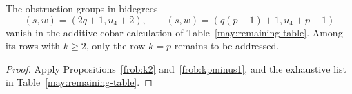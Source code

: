 \begin{corollary}\label{frob:vanishing}
The obstruction groups in bidegrees
\[
 (s,w)=(2q+1,u_4+2),\qquad
 (s,w)=(q(p-1)+1,u_4+p-1)
\]
vanish in the additive cobar calculation of
Table~\ref{may:remaining-table}.  Among its rows with $k\geq2$,
only the row $k=p$ remains to be addressed.
\end{corollary}

\begin{proof}
Apply Propositions~\ref{frob:k2} and~\ref{frob:kpminus1},
and the exhaustive list in Table~\ref{may:remaining-table}.
\end{proof}
